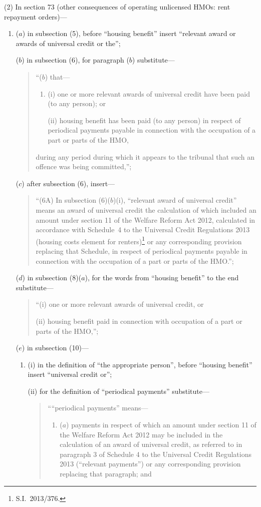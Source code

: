 \documentclass[12pt,a4paper]{article}
\begin{document}
(2) In section 73 (other consequences of operating unlicensed HMOs: rent repayment orders)—
\begin{enumerate}\item[]
($a$) in subsection (5), before “housing benefit” insert “relevant award or awards of universal credit or the”;

($b$) in subsection (6), for paragraph ($b$)  substitute—
\begin{quotation}
“($b$) that—
\begin{enumerate}\item[]
(i) one or more relevant awards of universal credit have been paid (to any person); or

(ii) housing benefit has been paid (to any person) in respect of periodical payments payable in connection with the occupation of a part or parts of the HMO,
\end{enumerate}
during any period during which it appears to the tribunal that such an offence was being committed,”;
\end{quotation}

($c$) after subsection (6), insert—
\begin{quotation}
“(6A) In subsection (6)($b$)(i), “relevant award of universal credit” means an award of universal credit the calculation of which included an amount under section 11 of the Welfare Reform Act 2012, calculated in accordance with Schedule~4 to the Universal Credit Regulations 2013 (housing costs element for renters)\footnote{S.I.~2013/376.} or any corresponding provision replacing that Schedule, in respect of periodical payments payable in connection with the occupation of a part or parts of the HMO.”;
\end{quotation}

($d$) in subsection (8)($a$), for the words from “housing benefit” to the end substitute—
\begin{quotation}
“(i) one or more relevant awards of universal credit, or

(ii) housing benefit paid in connection with occupation of a part or parts of the HMO,”;
\end{quotation}

($e$) in subsection (10)—
\begin{enumerate}\item[]
(i) in the definition of “the appropriate person”, before “housing benefit” insert “universal credit or”;

(ii) for the definition of “periodical payments” substitute—
\begin{quotation}
““periodical payments” means—
\begin{enumerate}\item[]
($a$) 
payments in respect of which an amount under section 11 of the Welfare Reform Act 2012 may be included in the calculation of an award of universal credit, as referred to in paragraph 3 of Schedule 4 to the Universal Credit Regulations 2013 (“relevant payments”) or any corresponding provision replacing that paragraph; and


\end{enumerate}
\end{quotation}
\end{enumerate}
\end{enumerate}
\end{document}
